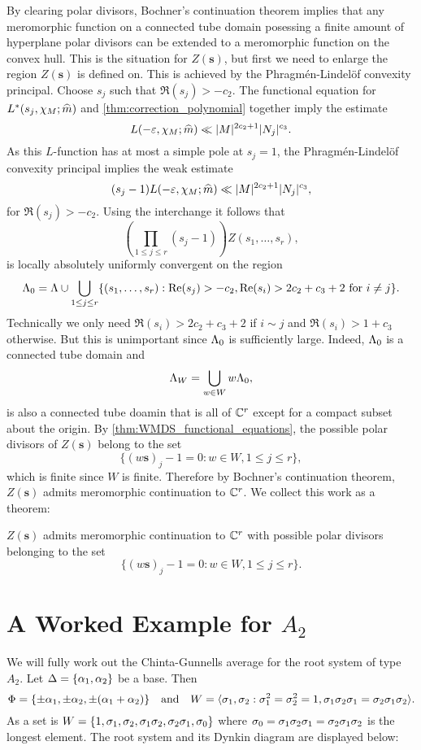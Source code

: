 \documentclass[12pt,reqno,oneside]{amsart}
\begin{document}
    By clearing polar divisors, Bochner's continuation theorem implies that any meromorphic function on a connected tube domain posessing a finite amount of hyperplane polar divisors can be extended to a meromorphic function on the convex hull. This is the situation for $Z(\mathbf{s})$, but first we need to enlarge the region $Z(\mathbf{s})$ is defined on. This is achieved by the Phragm\'en-Lindel\"of convexity principal. Choose $s_{j}$ such that $\Re(s_{j}) > -c_{2}$. The functional equation for $L^{\ast}(s_{j},\chi_{M};\widehat{m})$ and \cref{thm:correction_polynomial} together imply the estimate
    \[
        L(-\varepsilon,\chi_{M};\widehat{m}) \ll |M|^{2c_{2}+1}|N_{j}|^{c_{3}}.
    \]
    As this $L$-function has at most a simple pole at $s_{j} = 1$, the Phragm\'en-Lindel\"of convexity principal implies the weak estimate
    \[
        (s_{j}-1)L(-\varepsilon,\chi_{M};\widehat{m}) \ll |M|^{2c_{2}+1}|N_{j}|^{c_{3}},
    \]
    for $\Re(s_{j}) > -c_{2}$. Using the interchange it follows that
    \[
        \left(\prod_{1 \le j \le r}(s_{j}-1)\right)Z(s_{1},\ldots,s_{r}),
    \]
    is locally absolutely uniformly convergent on the region
    \[
        \Lambda_{0} = \Lambda \cup \bigcup_{1 \le j \le r} \{(s_{1},\ldots,s_{r}):\mathrm{Re}(s_{j}) > -c_{2}, \mathrm{Re}(s_{i}) > 2c_{2}+c_{3}+2 \text{ for } i \neq j\}.
    \]
    Technically we only need $\Re(s_{i}) > 2c_{2}+c_{3}+2$ if $i \sim j$ and $\Re(s_{i}) > 1+c_{3}$ otherwise. But this is unimportant since $\Lambda_{0}$ is sufficiently large. Indeed, $\Lambda_{0}$ is a connected tube domain and
    \[
        \Lambda_{W} = \bigcup_{w \in W}w\Lambda_{0},
    \]
    is also a connected tube doamin that is all of $\mathbb{C}^{r}$ except for a compact subset about the origin. By \cref{thm:WMDS_functional_equations}, the possible polar divisors of $Z(\mathbf{s})$ belong to the set
    \[
        \{(w\mathbf{s})_{j}-1 = 0:w \in W, 1 \le j \le r\},
    \]
    which is finite since $W$ is finite. Therefore by Bochner's continuation theorem, $Z(\mathbf{s})$ admits meromorphic continuation to $\mathbb{C}^{r}$. We collect this work as a theorem:

    \begin{theorem}
        $Z(\mathbf{s})$ admits meromorphic continuation to $\mathbb{C}^{r}$ with possible polar divisors belonging to the set
        \[
            \{(w\mathbf{s})_{j}-1 = 0:w \in W, 1 \le j \le r\}.
        \]
    \end{theorem}
\section{A Worked Example for \texorpdfstring{$A_{2}$}{A{2}}}
    We will fully work out the Chinta-Gunnells average for the root system of type $A_{2}$. Let $\Delta = \{\alpha_{1},\alpha_{2}\}$ be a base. Then
    \[
        \Phi = \{\pm\alpha_{1},\pm\alpha_{2},\pm(\alpha_{1}+\alpha_{2})\} \quad \text{and} \quad W = \langle\sigma_{1},\sigma_{2}:\sigma_{1}^{2} = \sigma_{2}^{2} = 1, \sigma_{1}\sigma_{2}\sigma_{1} = \sigma_{2}\sigma_{1}\sigma_{2}\rangle.
    \]
    As a set is $W = \{1,\sigma_{1},\sigma_{2},\sigma_{1}\sigma_{2},\sigma_{2}\sigma_{1},\sigma_{0}\}$ where $\sigma_{0} = \sigma_{1}\sigma_{2}\sigma_{1} = \sigma_{2}\sigma_{1}\sigma_{2}$ is the longest element. The root system and its Dynkin diagram are displayed below:
\end{document}
